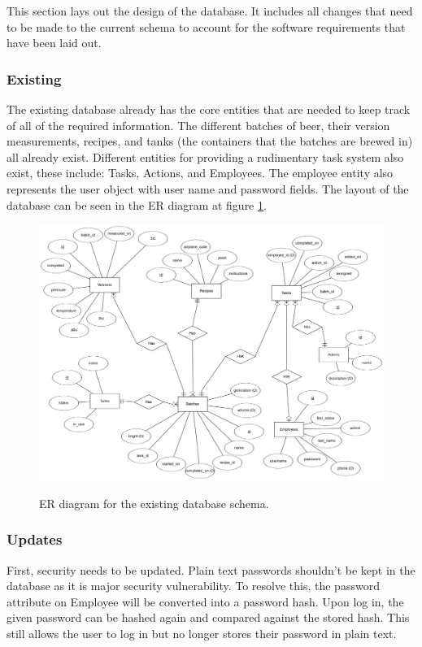     This section lays out the design of the database.  It includes all changes that need to be made to the current schema to account for the software requirements that have been laid out.
    
        \subsubsection{Existing}
        The existing database already has the core entities that are needed to keep track of all of the required information.  The different batches of beer, their version measurements, recipes, and tanks (the containers that the batches are brewed in) all already exist.  Different entities for providing a rudimentary task system also exist, these include: Tasks, Actions, and Employees.  The employee entity also represents the user object with user name and password fields.  The layout of the database can be seen in the ER diagram at figure \ref{erd}.
        
        \begin{figure}
            \centering
            \caption{ER diagram for the existing database schema.}
            \includegraphics[angle=90,origin=c,width=\textwidth,keepaspectratio]{./diagrams/erdplus-diagram.png}
            \label{erd}
        \end{figure}
    
        \subsubsection{Updates}
        First, security needs to be updated.  Plain text passwords shouldn't be kept in the database as it is major security vulnerability. To resolve this, the password attribute on Employee will be converted into a password hash.  Upon log in, the given password can be hashed again and compared against the stored hash.  This still allows the user to log in but no longer stores their password in plain text.
        
